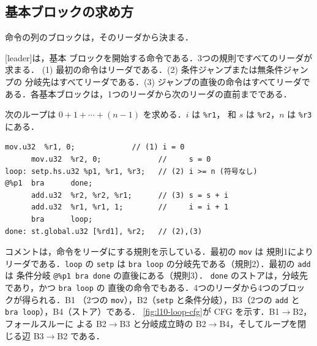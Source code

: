 \documentclass[../main.tex]{subfiles}
\begin{document}
\subsection{基本ブロックの求め方}

命令の列のブロックは，そのリーダから決まる．

\begin{definition}[リーダ]
  [leader]は，基本
  ブロックを開始する命令である．3つの規則ですべてのリーダが求まる．
  (1) 最初の命令はリーダである．(2) 条件ジャンプまたは無条件ジャンプの
  分岐先はすべてリーダである．(3) ジャンプの直後の命令はすべてリーダで
  ある．各基本ブロックは，1つのリーダから次のリーダの直前までである．
\end{definition}


\begin{example}
  \label{ex:l10-leaders}
  次のループは $0+1+\cdots+(n-1)$ を求める．$i$ は \texttt{\%r1}，
  和 $s$ は \texttt{\%r2}，$n$ は \texttt{\%r3} にある．
\begin{lstlisting}[language=PTX, numbers=none]
      mov.u32  %r1, 0;             // (1) i = 0
      mov.u32  %r2, 0;             //     s = 0
loop: setp.hs.u32 %p1, %r1, %r3;   // (2) i >= n (符号なし)
@%p1  bra      done;
      add.u32  %r2, %r2, %r1;      // (3) s = s + i
      add.u32  %r1, %r1, 1;        //     i = i + 1
      bra      loop;
done: st.global.u32 [%rd1], %r2;   // (2),(3)
\end{lstlisting}
  コメントは，命令をリーダにする規則を示している．最初の \texttt{mov} は
  規則1によりリーダである．\texttt{loop} の \texttt{setp} は
  \texttt{bra loop} の分岐先である（規則2）．最初の \texttt{add} は
  条件分岐 \texttt{@\%p1 bra done} の直後にある（規則3）．
  \texttt{done} のストアは，分岐先であり，かつ \texttt{bra loop} の
  直後の命令でもある．4つのリーダから4つのブロックが得られる．B1
  （2つの \texttt{mov}），B2（\texttt{setp} と条件分岐），B3（2つの
  \texttt{add} と \texttt{bra loop}），B4（ストア）である．
  \cref{fig:l10-loop-cfg}が CFG を示す．B1$\to$B2，フォールスルーに
  よる B2$\to$B3 と分岐成立時の B2$\to$B4，そしてループを閉じる辺
  B3$\to$B2 である．
\end{example}
\end{document}
